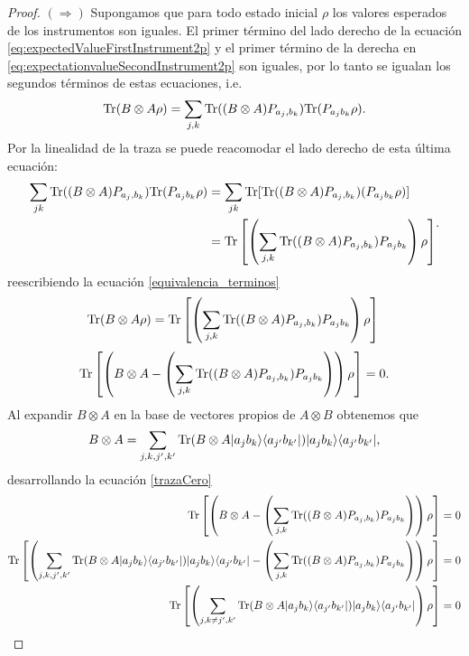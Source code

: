\begin{proof}
    $(\Rightarrow)$ Supongamos que para todo estado inicial $\rho$ los valores esperados de los instrumentos son iguales. El primer término del lado derecho de la ecuación {\eqref{eq:expectedValueFirstInstrument2p}} y el primer término de la derecha en {\eqref{eq:expectationvalueSecondInstrument2p}} son iguales, por lo tanto se igualan los segundos términos de estas ecuaciones, i.e.\begin{equation}\label{equivalencia_terminos}{\rm Tr}(B\otimes A \rho)=\sum_{j,k}{\rm Tr}((B\otimes A) P_{a_j,b_k}){\rm Tr}(P_{a_j b_k}\rho ).\end{equation} Por la linealidad de la traza se puede reacomodar el lado derecho de esta última ecuación: \[\begin{split}\sum_{jk}{\rm Tr}((B\otimes A) P_{a_j,b_k}){\rm Tr}(P_{a_j b_k}\rho )&= \sum_{jk}{\rm Tr}[{\rm Tr}((B\otimes A) P_{a_j,b_k})(P_{a_j b_k}\rho )]\\
        &={\rm Tr}\left[\left(\sum_{j,k}{\rm Tr}((B\otimes A) P_{a_j,b_k})P_{a_j b_k}\right)\rho \right]\end{split}.\]  reescribiendo la ecuación {\ref{equivalencia_terminos}} 
        \[{\rm Tr}(B\otimes A \rho)={\rm Tr}\left[\left(\sum_{j,k}{\rm Tr}((B\otimes A) P_{a_j,b_k})P_{a_j b_k}\right)\rho \right]\\ \]
    \begin{equation}\label{trazaCero}\begin{split}
        {\rm Tr}\left[\left(B\otimes A-\left(\sum_{j,k}{\rm Tr}((B\otimes A) P_{a_j,b_k})P_{a_j b_k}\right)\right)\rho \right]=0\\ \end{split}.\end{equation}
        Al expandir $B\otimes A$ en la base de vectores propios de $A\otimes B$ obtenemos que \[B\otimes A=\sum_{j,k,j',k'}{\rm Tr}(B\otimes A |a_j b_k\rangle \langle a_{j'}b_{k'}|)|a_j b_k\rangle \langle a_{j'}b_{k'}|,\] desarrollando la ecuación {\ref{trazaCero}}   
    \[\begin{split}
        \tr\left[\left(B\otimes A-\left(\sum_{j,k}\tr((B\otimes A) P_{a_j,b_k})P_{a_j b_k}\right)\right)\rho\right]&=0\\
    \tr\left[\left(\sum_{j,k,j',k'}\tr(B\otimes A |a_j b_k\rala a_{j'}b_{k'}|)|a_j b_k\rala a_{j'}b_{k'}|-\left(\sum_{j,k}\tr((B\otimes A) P_{a_j,b_k})P_{a_j b_k}\right)\right)\rho\right]&=0\\
    \tr\left[\left(\sum_{j,k\ne j',k'}\tr(B\otimes A |a_j b_k\rala a_{j'}b_{k'}|)|a_j b_k\rala a_{j'}b_{k'}|\right)\rho\right]&=0\\

\end{split}\]
\end{proof}

